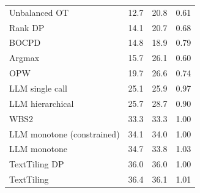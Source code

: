 \begin{table}[t]
\begin{tabular*}{\linewidth}{@{\extracolsep{\fill}}lrrr@{}}
Unbalanced OT & 12.7 & 20.8 & 0.61 \\
Rank DP & 14.1 & 20.7 & 0.68 \\
BOCPD & 14.8 & 18.9 & 0.79 \\
Argmax & 15.7 & 26.1 & 0.60 \\
OPW & 19.7 & 26.6 & 0.74 \\
LLM single call & 25.1 & 25.9 & 0.97 \\
LLM hierarchical & 25.7 & 28.7 & 0.90 \\
WBS2 & 33.3 & 33.3 & 1.00 \\
LLM monotone (constrained) & 34.1 & 34.0 & 1.00 \\
LLM monotone & 34.7 & 33.8 & 1.03 \\
TextTiling DP & 36.0 & 36.0 & 1.00 \\
TextTiling & 36.4 & 36.1 & 1.01 \\
\bottomrule
\end{tabular*}
\end{table}

